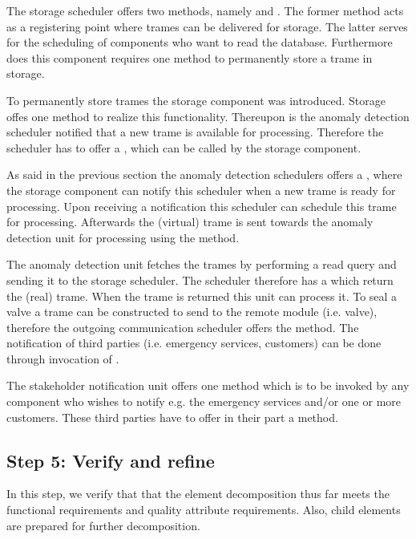 \npar The storage scheduler offers two methods, namely
 and . The
former method acts as a registering point where trames can be delivered for
storage. The latter serves for the scheduling of components who want
to read the database. Furthermore does this component requires one method
 to permanently store a trame in storage.

\npar To permanently store trames the storage component was introduced. Storage
offes one method  to realize this functionality.
Thereupon is the anomaly detection scheduler notified that a new trame is
available for processing. Therefore the scheduler has to offer a
, which can be called by the storage component.

\npar As said in the previous section the anomaly detection schedulers offers a
, where the storage component can notify this scheduler
when a new trame is ready for processing. Upon receiving a notification this
scheduler can schedule this trame for processing. Afterwards the (virtual)
trame is sent towards the anomaly detection unit for processing using the
 method.

\npar The anomaly detection unit fetches the trames by performing a read query
and sending it to the storage scheduler. The scheduler therefore has a
 which return the (real) trame. When the trame is
returned this unit can process it. To seal a valve a trame can be constructed to
send to the remote module (i.e. valve), therefore the outgoing
communication scheduler offers the  method. The
notification of third parties (i.e. emergency services, customers) can be done
through invocation of .

\npar The stakeholder notification unit offers one method
 which is to be invoked by any component who
wishes to notify e.g. the emergency services and/or one or more customers. These
third parties have to offer in their part a  method.

\subsection{Step 5: Verify and refine}
\label{add:it1/verification}

\npar In this step, we verify that that the element decomposition thus far meets
the functional requirements and quality attribute requirements. Also, child
elements are prepared for further decomposition.

